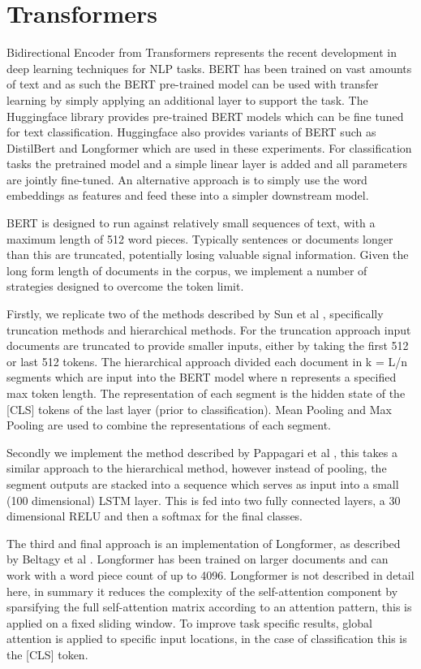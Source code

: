 \documentclass[twocolumn,10pt]{wmrDoc}
\begin{document}
\section{Transformers}
Bidirectional Encoder from Transformers \cite{devlin} represents the recent development in deep learning techniques for NLP tasks. BERT has been trained on vast amounts of text and as such the BERT pre-trained model can be used with transfer learning by simply applying an additional layer to support the task. The Huggingface library provides pre-trained BERT models which can be fine tuned for text classification. Huggingface also provides  variants of BERT such as DistilBert and Longformer which are used in these experiments. For classification tasks the pretrained model and a simple linear layer is added and all parameters are jointly fine-tuned. An alternative approach is to simply use the word embeddings as features and feed these into a simpler downstream model. 

BERT is designed to run against relatively small sequences of text, with a maximum length of 512 word pieces. Typically sentences or documents longer than this are truncated, potentially losing valuable signal information. Given the long form length of documents in the corpus, we implement a number of strategies designed to overcome the token limit.

Firstly, we replicate two of the methods described by Sun et al \cite{sun}, specifically truncation methods and hierarchical methods. For the truncation approach input documents are truncated to provide smaller inputs, either by taking the first 512 or last 512 tokens. The hierarchical approach divided each document in k = L/n segments which are input into the BERT model where n represents a specified max token length. The representation of each segment is the hidden state of the [CLS] tokens of the last layer (prior to classification). Mean Pooling and Max Pooling are used to combine the representations of each segment.

Secondly we implement the method described by Pappagari et al \cite{Pappagari}, this takes a similar approach to the hierarchical method, however instead of pooling, the segment outputs are stacked into a sequence which serves as input into a small (100 dimensional) LSTM layer. This is fed into two fully connected layers, a 30 dimensional RELU and then a softmax for the final classes.

The third and final approach is an implementation of Longformer, as described by Beltagy et al \cite{longformer}. Longformer has been trained on larger documents and can work with a word piece count of up to 4096. Longformer is not described in detail here, in summary it reduces the complexity of the self-attention component by sparsifying the full self-attention matrix according to an attention pattern, this is applied on a fixed sliding window. To improve task specific results, global attention is applied to specific input locations, in the case of classification this is the [CLS] token.
\end{document}
